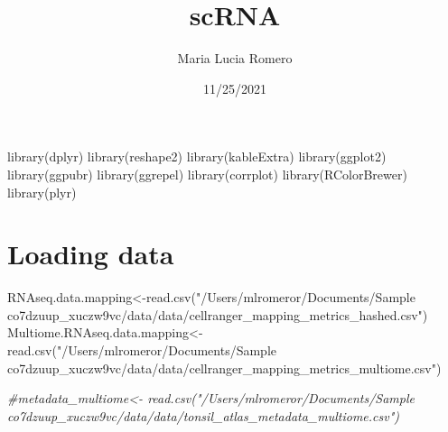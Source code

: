 \documentclass[
]{article}
\title{scRNA}
\author{Maria Lucia Romero}
\date{11/25/2021}
\newenvironment{Shaded}{\begin{snugshade}}{\end{snugshade}}
\newcommand{\CommentTok}[1]{\textcolor[rgb]{0.56,0.35,0.01}{\textit{#1}}}
\newcommand{\FunctionTok}[1]{\textcolor[rgb]{0.00,0.00,0.00}{#1}}
\newcommand{\NormalTok}[1]{#1}
\newcommand{\OtherTok}[1]{\textcolor[rgb]{0.56,0.35,0.01}{#1}}
\newcommand{\SpecialCharTok}[1]{\textcolor[rgb]{0.00,0.00,0.00}{#1}}
\newcommand{\StringTok}[1]{\textcolor[rgb]{0.31,0.60,0.02}{#1}}
\begin{document}
\maketitle

\begin{Shaded}
\begin{Highlighting}[]
\FunctionTok{library}\NormalTok{(dplyr)}
\FunctionTok{library}\NormalTok{(reshape2)}
\FunctionTok{library}\NormalTok{(kableExtra)}
\FunctionTok{library}\NormalTok{(ggplot2)}
\FunctionTok{library}\NormalTok{(ggpubr)}
\FunctionTok{library}\NormalTok{(ggrepel)}
\FunctionTok{library}\NormalTok{(corrplot)}
\FunctionTok{library}\NormalTok{(RColorBrewer)}
\FunctionTok{library}\NormalTok{(plyr)}
\end{Highlighting}
\end{Shaded}

\hypertarget{loading-data}{%
\section{Loading data}\label{loading-data}}

\begin{Shaded}
\begin{Highlighting}[]
\NormalTok{RNAseq.data.mapping}\OtherTok{\textless{}{-}}\FunctionTok{read.csv}\NormalTok{(}\StringTok{"/Users/mlromeror/Documents/Sample co7dzuup\_xuczw9vc/data/data/cellranger\_mapping\_metrics\_hashed.csv"}\NormalTok{)}
\NormalTok{Multiome.RNAseq.data.mapping}\OtherTok{\textless{}{-}}\FunctionTok{read.csv}\NormalTok{(}\StringTok{"/Users/mlromeror/Documents/Sample co7dzuup\_xuczw9vc/data/data/cellranger\_mapping\_metrics\_multiome.csv"}\NormalTok{)}

\CommentTok{\#metadata\_multiome\textless{}{-} read.csv("/Users/mlromeror/Documents/Sample co7dzuup\_xuczw9vc/data/data/tonsil\_atlas\_metadata\_multiome.csv")}
\end{Highlighting}
\end{Shaded}

\begin{Shaded}
\end{Shaded}
\end{document}

